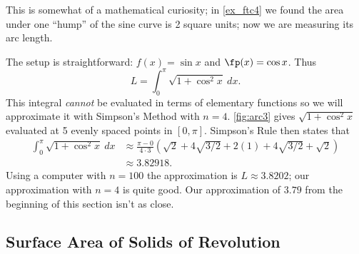 {This is somewhat of a mathematical curiosity; in \autoref{ex_ftc4} we found the area under one ``hump'' of the sine curve is 2 square units; now we are measuring its arc length.

The setup is straightforward: $f(x) = \sin x$ and $\fp(x) = \cos x$. Thus 
\[L = \int_0^\pi \sqrt{1+\cos^2x}\ dx.\]
This integral \textit{cannot} be evaluated in terms of elementary functions so we will approximate it with Simpson's Method with $n=4$. \autoref{fig:arc3} gives $\sqrt{1+\cos^2x}$ evaluated at 5 evenly spaced points in $[0,\pi]$. Simpson's Rule then states that 
\begin{align*}
	\int_0^\pi \sqrt{1+\cos^2x}\ dx
	&\approx	\frac{\pi-0}{4\cdot 3}
	\left(\sqrt{2}+4\sqrt{3/2}+2(1)+4\sqrt{3/2}+\sqrt{2}\right) \\
	&\approx3.82918.
\end{align*}
Using a computer with $n=100$ the approximation is $L\approx 3.8202$; our approximation with $n=4$ is quite good.  Our approximation of $3.79$ from the beginning of this section isn't as close.}

\subsection*{Surface Area of Solids of Revolution}

